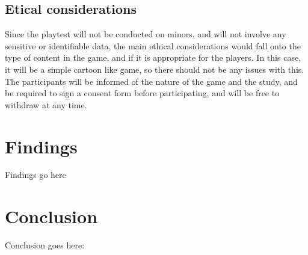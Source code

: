 \documentclass[conference]{IEEEtran}
\begin{document}
\subsection{Etical considerations}

Since the playtest will not be conducted on minors, and will not involve any sensitive or identifiable data, the main ethical considerations
would fall onto the type of content in the game, and if it is appropriate for the players. In this case, it will be a simple cartoon like game,
so there should not be any issues with this. The participants will be informed of the nature of the game and the study, and be required to
sign a consent form before participating, and will be free to withdraw at any time.


\section{Findings}

Findings go here

\section{Conclusion}

Conclusion goes here:



\end{document}
